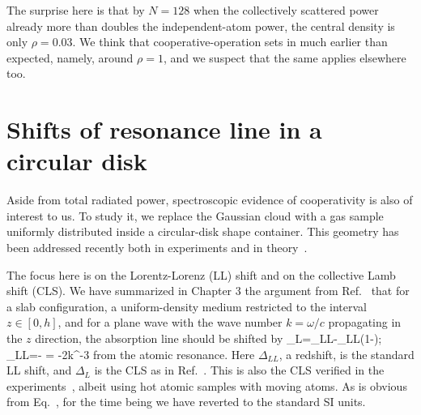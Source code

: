 The surprise here is that by $N=128$ when the collectively scattered power already more than doubles the independent-atom power, the central density is only $\rho=0.03$. We think that cooperative-operation sets in much earlier than expected, namely, around $\rho=1$, and we suspect that the same applies elsewhere too.


 

\section{Shifts of resonance line in a circular disk}

Aside from total radiated power, spectroscopic evidence of cooperativity is also of interest to us. To study it, we replace the Gaussian cloud with a gas sample uniformly distributed inside a circular-disk shape container. This geometry has been addressed recently both in experiments and in theory~\cite{PhysRevLett.108.173601,PhysRevLett.108.173601,Javanainen:16}.

The focus here is on the Lorentz-Lorenz (LL) shift and on the collective Lamb shift (CLS). 
We have summarized in Chapter 3 the argument from Ref.~\cite{FRIEDBERG1973101} that for a slab configuration, a uniform-density medium restricted to the interval $z\in [0,h]$, and for a plane wave with the wave number $k=\omega/c$ propagating in the $z$ direction, the absorption line should be shifted by
\bea
\Delta_L=\Delta_{LL}-\Delta_{LL}\left(1-\right);\,\quad\Delta_{LL}=- = -2\pi\rho k^{-3}\gamma
\label{LL_CLS}
\eea
from the atomic resonance. Here $\Delta_{LL}$, a redshift, is the standard LL shift, and $\Delta_L$ is the CLS as in Ref.~\cite{FRIEDBERG1973101}.  This is also the CLS verified in the experiments~\cite{PhysRevLett.108.173601}, albeit using hot atomic samples with moving atoms. As is obvious from Eq.~, for the time being we have reverted to the standard SI units.

